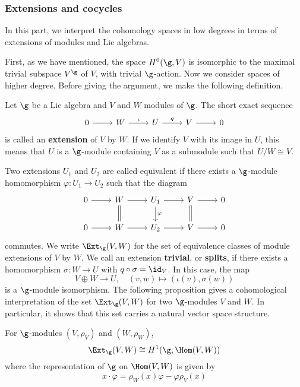\subsubsection{Extensions and cocycles}
In this part, we interpret the cohomology spaces in low degrees in terms of extensions of modules and Lie algebras.\par
First, as we have mentioned, the space $H^0(\g,V)$ is isomorphic to the maximal trivial subspace $V^\g$ of $V$, with trivial $\g$-action. Now we consider spaces of higher degree. Before giving the argument, we make the following definition.\par
Let $\g$ be a Lie algebra and $V$ and $W$ modules of $\g$. The short exact sequence
\[\begin{tikzcd}
0\ar[r]&W\ar[r,"\iota"]&U\ar[r,"q"]&V\ar[r]&0
\end{tikzcd}\]
is called an \textbf{extension} of $V$ by $W$. If we identify $V$ with its image in $U$, this means that $U$ is a $\g$-module containing $V$ as a submodule such that $U/W\cong V$.\par
Two extensions $U_1$ and $U_2$ are called equivalent if there exists a $\g$-module homomorphism $\varphi:U_1\to U_2$ such that the diagram
\[\begin{tikzcd}
0\ar[r]&W\ar[d,equal]\ar[r]&U_1\ar[d,"\varphi"]\ar[r]&V\ar[r]\ar[d,equal]&0\\
0\ar[r]&W\ar[r]&U_2\ar[r]&V\ar[r]&0
\end{tikzcd}\]
commutes. We write $\Ext_\g(V,W)$ for the set of equivalence classes of module extensions of $V$ by $W$. We call an extension \textbf{trivial}, or \textbf{splits}, if there exists a homomorphism $\sigma:W\to U$ with $q\circ\sigma=\id_V$. In this case, the map
\[V\oplus W\to U,\quad (v,w)\mapsto(\iota(v),\sigma(w))\]
is a $\g$-module isomorphism.
The following proposition gives a cohomological interpretation of the set $\Ext_\g(V,W)$ for two $\g$-modules $V$ and $W$. In particular, it shows that this set carries a natural vector space structure.
\begin{proposition}\label{Lie algebra cohomology H^1 extension char}
For $\g$-modules $(V,\rho_V)$ and $(W,\rho_W)$,
\[\Ext_\g(V,W)\cong H^1(\g,\Hom(V,W))\]
where the representation of $\g$ on $\Hom(V,W)$ is given by
\[x\cdot\varphi=\rho_W(x)\varphi-\varphi\rho_V(x)\]
\end{proposition}
